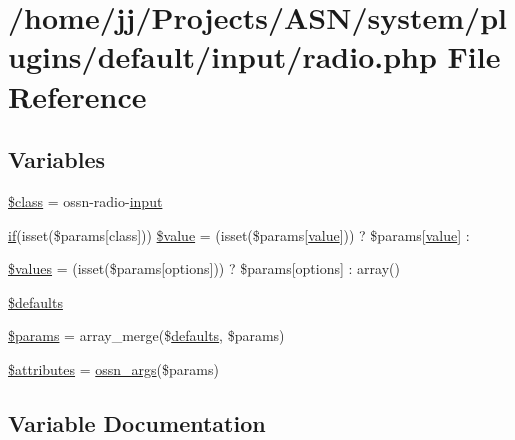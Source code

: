 \hypertarget{radio_8php}{}\section{/home/jj/\+Projects/\+A\+S\+N/system/plugins/default/input/radio.php File Reference}
\label{radio_8php}
\subsection*{Variables}
\begin{DoxyCompactItemize}
\item 
\hyperlink{radio_8php_a252ba022809910ea710a068fc1bab657}{\$class} = \textquotesingle{}ossn-\/radio-\/\hyperlink{ossn_8lib_8input_8php_a64ebee98b041c4f75f71ed3cd73cc8ed}{input}\textquotesingle{}
\item 
\hyperlink{jquery_8tokeninput_8js_ad8dd46a3cbc004569e34401e9e71771a}{if}(isset(\$params\mbox{[}\textquotesingle{}class\textquotesingle{}\mbox{]})) \hyperlink{radio_8php_a5bd63f8afd4dd4ba86dcdf5618904298}{\$value} = (isset(\$params\mbox{[}\textquotesingle{}\hyperlink{fullpage_2plugin_8min_8js_ac56c57897e10f699d124e0103921aa20}{value}\textquotesingle{}\mbox{]})) ? \$params\mbox{[}\textquotesingle{}\hyperlink{fullpage_2plugin_8min_8js_ac56c57897e10f699d124e0103921aa20}{value}\textquotesingle{}\mbox{]} \+: \textquotesingle{}\textquotesingle{}
\item 
\hyperlink{radio_8php_affc45c6ace2eeb3f300b054dbf9592b6}{\$values} = (isset(\$params\mbox{[}\textquotesingle{}options\textquotesingle{}\mbox{]})) ? \$params\mbox{[}\textquotesingle{}options\textquotesingle{}\mbox{]} \+: array()
\item 
\hyperlink{radio_8php_a34ddfd723e30abea0a92b81f4443ac6a}{\$defaults}
\item 
\hyperlink{radio_8php_afe68e6fbe7acfbffc0af0c84a1996466}{\$params} = array\+\_\+merge(\$\hyperlink{_chart_8_core_8js_afbaa35e32dd50615b39a75e1e5ec6921}{defaults}, \$params)
\item 
\hyperlink{radio_8php_adc851f7a62250e75df0490c0280aef4c}{\$attributes} = \hyperlink{ossn_8lib_8views_8php_a90922f09de8a06ea85351afb51fac9f7}{ossn\+\_\+args}(\$params)
\end{DoxyCompactItemize}


\subsection{Variable Documentation}
